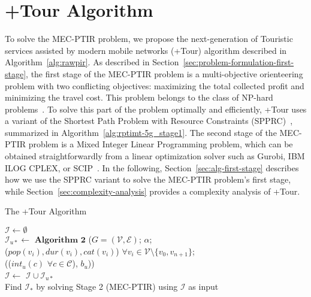 
\section{+Tour Algorithm}\label{sec:solution}

To solve the MEC-PTIR problem, we propose the next-generation of Touristic services assisted by modern mobile networks (+Tour) algorithm described in Algorithm~\ref{alg:rawpir}. As described in Section~\ref{sec:problem-formulation-first-stage}, the first stage of the MEC-PTIR problem is a multi-objective orienteering problem with two conflicting objectives: maximizing the total collected profit and minimizing the travel cost. This problem belongs to the class of NP-hard problems~\cite{feillet-tsp:05}. To solve this part of the problem optimally and efficiently, +Tour uses a variant of the Shortest Path Problem with Resource Constraints (SPPRC)~\cite{irnich-shortest:05}, summarized in Algorithm~\ref{alg:rptimt-5g_stage1}. The second stage of the MEC-PTIR problem is a Mixed Integer Linear Programming problem, which can be obtained straightforwardly from a linear optimization solver such as Gurobi, IBM ILOG CPLEX, or SCIP~\cite{meindl2012analysis}. In the following, Section~\ref{sec:alg-first-stage} describes how we use the SPPRC variant to solve the MEC-PTIR problem's first stage, while Section~\ref{sec:complexity-analysis} provides a complexity analysis of +Tour.

\begin{algorithm} [!ht]
\label{alg:rawpir}

\caption{The +Tour Algorithm}
\DontPrintSemicolon
\small
{}

\BlankLine
\BlankLine
 $\mathcal{I} \gets \emptyset$ \\
{
    $\mathcal{I}_{u*} \gets$ $\textbf{Algorithm 2}$ ($G = (\mathcal{V},\mathcal{E})$; $\alpha$;\\ 
    \nonl ($pop(v_{i}), dur(v_{i}), cat(v_{i})$) $\forall v_i \in \mathcal{V} \setminus \{v_{0}, v_{n+1}\}$; \\
    \nonl (($int_{u}(c)$ $\forall c \in \mathcal{C}$), $b_u$)) \\
    $\mathcal{I} \gets$ $\mathcal{I} \cup \mathcal{I}_{u*}$ \\ 
    
}
Find $\mathcal{I}_*$ by solving Stage 2 (MEC-PTIR) using $\mathcal{I}$ as input \\
\end{algorithm}

